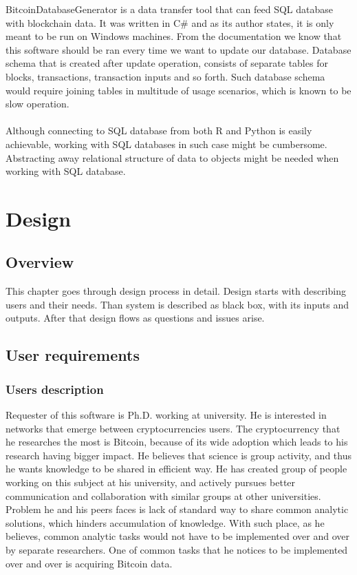 \documentclass[12pt, en, eng, oneside]{mgr}
\begin{document}
BitcoinDatabaseGenerator is a data transfer tool that can feed SQL database with blockchain data. It was written in C\# and as its author states, it is only meant to be run on Windows machines. From the documentation we know that this software should be ran every time we want to update our database. Database schema that is created after update operation, consists of separate tables for blocks, transactions, transaction inputs and so forth. Such database schema would require joining tables in multitude of usage scenarios, which is known to be slow operation.
\\
\\
Although connecting to SQL database from both R and Python is easily achievable, working with SQL databases in such case might be cumbersome. Abstracting away relational structure of data to objects might be needed when working with SQL database. 


\chapter{Design}

\section{Overview}
This chapter goes through design process in detail. Design starts with describing users and their needs. Than system is described as black box, with its inputs and outputs. After that design flows as questions and issues arise. 

\section{User requirements}

\subsection{Users description}

Requester of this software is Ph.D. working at university. He is interested in networks that emerge between cryptocurrencies users. The cryptocurrency that he researches the most is Bitcoin, because of its wide adoption which leads to his research having bigger impact. He believes that science is group activity, and thus he wants knowledge to be shared in efficient way. He has created group of people working on this subject at his university, and actively pursues better communication and collaboration with similar groups at other universities. Problem he and his peers faces is lack of standard way to share common analytic solutions, which hinders accumulation of knowledge. With such place, as he believes, common analytic tasks would not have to be implemented over and over by separate researchers. One of common tasks that he notices to be implemented over and over is acquiring Bitcoin data.  
\end{document}
